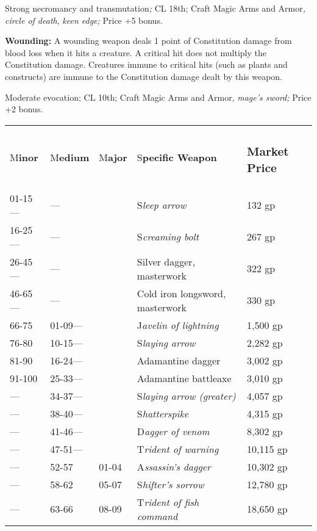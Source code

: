 \documentclass{article}
\begin{document}
Strong necromancy and transmutation\textit{; }CL 18th; Craft Magic Arms and Armor\textit{, 
circle of death}, \textit{keen edge; }Price +5 bonus.

\textbf{Wounding:} A wounding weapon deals 1 point of Constitution damage from 
blood loss when it hits a creature. A critical hit does not multiply the Constitution 
damage. Creatures immune to critical hits (such as plants and constructs) are immune 
to the Constitution damage dealt by this weapon.

Moderate evocation; CL 10th; Craft Magic Arms and Armor, \textit{mage's sword; 
}Price +2 bonus.

\vspace{12pt}
\begin{tabular}{|>{\raggedright}p{32pt}|>{\raggedright}p{38pt}|>{\raggedright}p{29pt}|>{\raggedright}p{132pt}|>{\raggedright}p{58pt}|}
\hline
\multicolumn{5}{|p{290pt}|}{\section*{T\textbf{able: Specific Weapons}}}\tabularnewline
\hline
M\textbf{inor} & M\textbf{edium} & M\textbf{ajor} & S\textbf{pecific Weapon} & \subsubsection*{M\textbf{arket 
Price}}\tabularnewline
\hline
01-15--- & --- &  & S\textit{leep arrow} & 132 gp\tabularnewline
\hline
16-25--- & --- &  & S\textit{creaming bolt} & 267 gp\tabularnewline
\hline
26-45--- & --- &  & Silver dagger, masterwork & 322 gp\tabularnewline
\hline
46-65--- & --- &  & Cold iron longsword, masterwork & 330 gp\tabularnewline
\hline
66-75 & 01-09--- &  & J\textit{avelin of lightning} & 1,500 gp\tabularnewline
\hline
76-80 & 10-15--- &  & S\textit{laying arrow} & 2,282 gp\tabularnewline
\hline
81-90 & 16-24--- &  & Adamantine dagger & 3,002 gp\tabularnewline
\hline
91-100 & 25-33--- &  & Adamantine battleaxe & 3,010 gp\tabularnewline
\hline
--- & 34-37--- &  & S\textit{laying arrow (greater)} & 4,057 gp\tabularnewline
\hline
--- & 38-40--- &  & S\textit{hatterspike} & 4,315 gp\tabularnewline
\hline
--- & 41-46--- &  & D\textit{agger of venom} & 8,302 gp\tabularnewline
\hline
--- & 47-51--- &  & T\textit{rident of warning} & 10,115 gp\tabularnewline
\hline
--- & 52-57 & 01-04 & A\textit{ssassin's dagger} & 10,302 gp\tabularnewline
\hline
--- & 58-62 & 05-07 & S\textit{hifter's sorrow} & 12,780 gp\tabularnewline
\hline
--- & 63-66 & 08-09 & T\textit{rident of fish command} & 18,650 gp\tabularnewline

\end{tabular}
\end{document}
